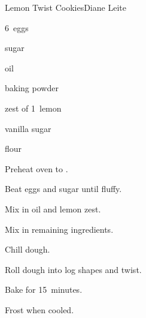 \begin{recipe}{Lemon Twist Cookies}{Diane Leite}{}

\begin{ingredients}
\item 6~eggs
\item {} sugar
\item {} oil
\item {} baking powder
\item zest of 1~lemon
\item {} vanilla sugar
\item {} flour
\end{ingredients}

\begin{directions}
\item Preheat oven to .
\item Beat eggs and sugar until fluffy.
\item Mix in oil and lemon zest.
\item Mix in remaining ingredients.
\item Chill dough.
\item Roll dough into log shapes and twist.
\item Bake for 15~minutes.
\item Frost when cooled.
\end{directions}

\end{recipe}
